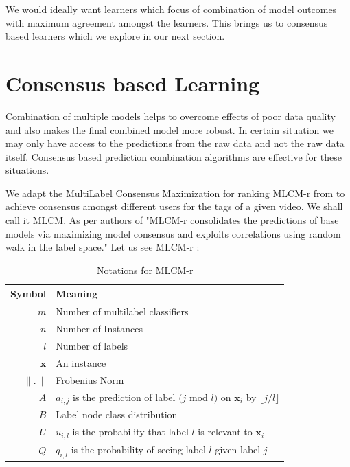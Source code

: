 \documentclass[12pt]{report}
\begin{document}
We would ideally want learners which focus of combination of model outcomes with maximum agreement amongst the learners. This brings us to consensus based learners which we explore in our next section.
\pagebreak

\section{Consensus based Learning}
Combination of multiple models helps to overcome effects of poor data quality and also makes the final combined model more robust. In certain situation we may only have access to the predictions from the raw data and not the raw data itself. Consensus based prediction combination algorithms are effective for these situations. 

We adapt the MultiLabel Consensus Maximization for ranking MLCM-r from \cite{MLCM} to achieve consensus amongst different users for the tags of a given video. We shall call it MLCM. As per authors of \cite{MLCM} "MLCM-r consolidates the predictions of base models via maximizing model consensus and exploits correlations using random walk in the label space." Let us see MLCM-r :

\begin{table}[htbp]\caption{Notations for MLCM-r}
\begin{center}%
\begin{tabular}{r | p{10cm} }
\toprule
Symbol & Meaning\\
\hline
$m$ & Number of multilabel classifiers\\
$n$ & Number of Instances\\
$l$ & Number of labels\\
$\boldsymbol{x}$ & An instance\\
$\|.\|$ & Frobenius Norm\\
$A$ & $a_{i,j}$ is the prediction of label $(j$ mod $l)$ on $\boldsymbol{x}_i$ by $\lfloor j/l \rfloor$\\
$B$ & Label node class distribution\\
$U$ & $u_{i,l}$ is the probability that label $l$ is relevant to $\boldsymbol{x}_i$\\
$Q$ & $q_{i,l}$ is the probability of seeing label $l$ given label $j$\\
\bottomrule
\end{tabular}
\end{center}
\label{tab:TableforMLCM}
\end{table}
\end{document}
